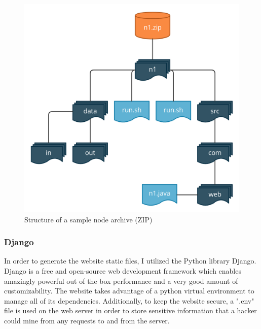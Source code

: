 \documentclass[fleqn,10pt]{SelfArx} %
\begin{document}
\begin{figure}[t!]
\centering
\includegraphics[width=\linewidth]{Figures/zip_example.png}
\caption{Structure of a sample node archive (ZIP)}
\label{fig:nodestructure}
\end{figure}

\subsubsection{Django}

In order to generate the website static files, I utilized the Python library Django. Django is a free and open-source web development framework which enables amazingly powerful out of the box performance and a very good amount of customizability. The website takes advantage of a python virtual environment to manage all of its dependencies. Additionally, to keep the website secure, a ".env" file is used on the web server in order to store sensitive information that a hacker could mine from any requests to and from the server.
\end{document}
